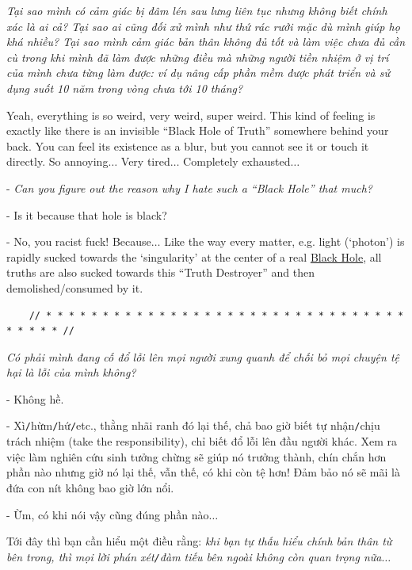 \documentclass[12pt]{article}
\numberwithin{equation}{section}
\begin{document}
\textit{Tại sao mình có cảm giác bị đâm lén sau lưng liên tục nhưng không biết chính xác là ai cả? Tại sao ai cũng đối xử mình như thứ rác rưởi mặc dù mình giúp họ khá nhiều? Tại sao mình cảm giác bản thân không đủ tốt và làm việc chưa đủ cần cù trong khi mình đã làm được những điều mà những người tiền nhiệm ở vị trí của mình chưa từng làm được: ví dụ nâng cấp phần mềm được phát triển và sử dụng suốt 10 năm trong vòng chưa tới 10 tháng?}

Yeah, everything is so weird, very weird, super weird. This kind of feeling is exactly like there is an invisible ``Black Hole of Truth'' somewhere behind your back. You can feel its existence as a blur, but you cannot see it or touch it directly. So annoying$\ldots$ Very tired$\ldots$ Completely exhausted$\ldots$

- \textit{Can you figure out the reason why I hate such a ``Black Hole'' that much?}

- Is it because that hole is black?

- No, you racist fuck! Because$\ldots$ Like the way every matter, e.g. light (`photon') is rapidly sucked towards the `singularity' at the center of a real \href{https://en.wikipedia.org/wiki/Black_hole}{Black Hole}, all truths are also sucked towards this ``Truth Destroyer'' and then demolished/consumed by it.

\begin{verbatim}
    // * * * * * * * * * * * * * * * * * * * * * * * * * * * * * * * * * * * * * //
\end{verbatim}

\noindent
{} \textit{Có phải mình đang cố đổ lỗi lên mọi người xung quanh để chối bỏ mọi chuyện tệ hại là lỗi của mình không?}

- Không hề.

- Xì\texttt{/}hừm\texttt{/}hứ\texttt{/}etc., thằng nhãi ranh đó lại thế, chả bao giờ biết tự nhận\texttt{/}chịu trách nhiệm (take the responsibility), chỉ biết đổ lỗi lên đầu người khác. Xem ra việc làm nghiên cứu sinh tưởng chừng sẽ giúp nó trưởng thành, chín chắn hơn phần nào nhưng giờ nó lại thế, vẫn thế, có khi còn tệ hơn! Đảm bảo nó sẽ mãi là đứa con nít không bao giờ lớn nổi.

- Ừm, có khi nói vậy cũng đúng phần nào$\ldots$

Tới đây thì bạn cần hiểu một điều rằng: \textit{khi bạn tự thấu hiểu chính bản thân từ bên trong, thì mọi lời phán xét\texttt{/}đàm tiếu bên ngoài không còn quan trọng nữa}$\ldots$
\end{document}
